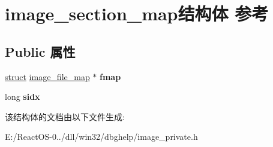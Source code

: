 \hypertarget{structimage__section__map}{}\section{image\+\_\+section\+\_\+map结构体 参考}
\label{structimage__section__map}
\subsection*{Public 属性}
\begin{DoxyCompactItemize}
\item 
\mbox{\label{structimage__section__map_a79a61abd28023c7ee52fa005ba3bd39b}} 
\hyperlink{interfacestruct}{struct} \hyperlink{structimage__file__map}{image\+\_\+file\+\_\+map} $\ast$ {\bfseries fmap}
\item 
\mbox{\label{structimage__section__map_a8784257367c2251e65927319f9a0a930}} 
long {\bfseries sidx}
\end{DoxyCompactItemize}


该结构体的文档由以下文件生成\+:\begin{DoxyCompactItemize}
\item 
E\+:/\+React\+O\+S-\/0../dll/win32/dbghelp/image\+\_\+private.\+h\end{DoxyCompactItemize}
